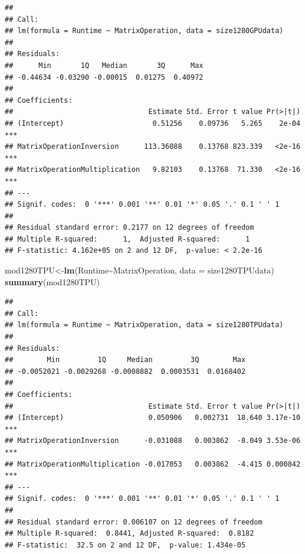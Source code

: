 \documentclass[
]{article}
\newenvironment{Shaded}{\begin{snugshade}}{\end{snugshade}}
\newcommand{\CommentTok}[1]{\textcolor[rgb]{0.56,0.35,0.01}{\textit{#1}}}
\newcommand{\DataTypeTok}[1]{\textcolor[rgb]{0.13,0.29,0.53}{#1}}
\newcommand{\KeywordTok}[1]{\textcolor[rgb]{0.13,0.29,0.53}{\textbf{#1}}}
\newcommand{\NormalTok}[1]{#1}
\newcommand{\OperatorTok}[1]{\textcolor[rgb]{0.81,0.36,0.00}{\textbf{#1}}}
\begin{document}
\begin{verbatim}
## 
## Call:
## lm(formula = Runtime ~ MatrixOperation, data = size1280GPUdata)
## 
## Residuals:
##      Min       1Q   Median       3Q      Max 
## -0.44634 -0.03290 -0.00015  0.01275  0.40972 
## 
## Coefficients:
##                                Estimate Std. Error t value Pr(>|t|)    
## (Intercept)                     0.51256    0.09736   5.265    2e-04 ***
## MatrixOperationInversion      113.36088    0.13768 823.339   <2e-16 ***
## MatrixOperationMultiplication   9.82103    0.13768  71.330   <2e-16 ***
## ---
## Signif. codes:  0 '***' 0.001 '**' 0.01 '*' 0.05 '.' 0.1 ' ' 1
## 
## Residual standard error: 0.2177 on 12 degrees of freedom
## Multiple R-squared:      1,  Adjusted R-squared:      1 
## F-statistic: 4.162e+05 on 2 and 12 DF,  p-value: < 2.2e-16
\end{verbatim}

\begin{Shaded}
\begin{Highlighting}[]
\NormalTok{mod1280TPU\textless{}{-}}\KeywordTok{lm}\NormalTok{(Runtime}\OperatorTok{\textasciitilde{}}\NormalTok{MatrixOperation, }\DataTypeTok{data =}\NormalTok{ size1280TPUdata)}
\KeywordTok{summary}\NormalTok{(mod1280TPU)}
\end{Highlighting}
\end{Shaded}

\begin{verbatim}
## 
## Call:
## lm(formula = Runtime ~ MatrixOperation, data = size1280TPUdata)
## 
## Residuals:
##        Min         1Q     Median         3Q        Max 
## -0.0052021 -0.0029268 -0.0008882  0.0003531  0.0168402 
## 
## Coefficients:
##                                Estimate Std. Error t value Pr(>|t|)    
## (Intercept)                    0.050906   0.002731  18.640 3.17e-10 ***
## MatrixOperationInversion      -0.031088   0.003862  -8.049 3.53e-06 ***
## MatrixOperationMultiplication -0.017053   0.003862  -4.415 0.000842 ***
## ---
## Signif. codes:  0 '***' 0.001 '**' 0.01 '*' 0.05 '.' 0.1 ' ' 1
## 
## Residual standard error: 0.006107 on 12 degrees of freedom
## Multiple R-squared:  0.8441, Adjusted R-squared:  0.8182 
## F-statistic:  32.5 on 2 and 12 DF,  p-value: 1.434e-05
\end{verbatim}

\begin{Shaded}
\end{Shaded}
\end{document}
